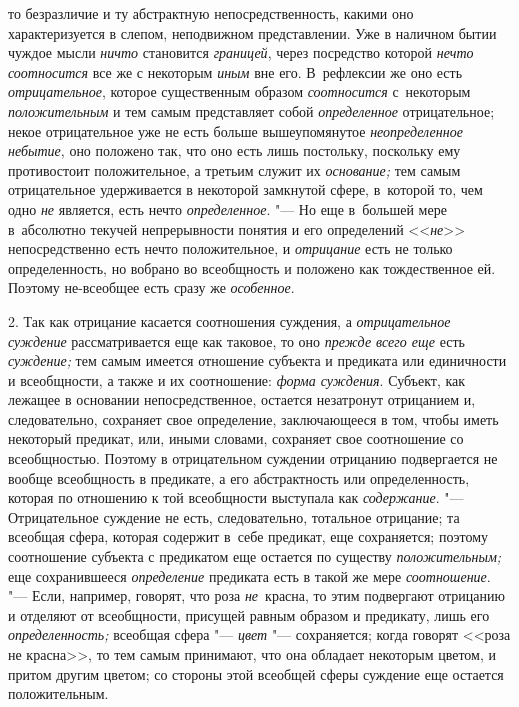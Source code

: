 то безразличие и ту абстрактную непосредственность, какими оно характеризуется
в слепом, неподвижном представлении. Уже в наличном бытии чуждое мысли
{\em ничто} становится {\em границей}, через посредство которой
{\em нечто соотносится} все же с некоторым {\em иным} вне его. В~рефлексии же
оно есть {\em отрицательное}, которое существенным образом {\em соотносится}
с~некоторым {\em положительным} и тем самым представляет собой
{\em определенное} отрицательное; некое отрицательное уже не есть больше
вышеупомянутое {\em неопределенное небытие}, оно положено так, что оно есть
лишь постольку, поскольку ему противостоит положительное, а третьим служит их
{\em основание;} тем самым отрицательное удерживается в некоторой замкнутой
сфере, в~которой то, чем одно {\em не} является, есть нечто {\em определенное}.
"--- Но еще в~большей мере в~абсолютно текучей непрерывности понятия и его
определений <<{\em не}>> непосредственно есть нечто
положительное, и {\em отрицание} есть не только определенность,
но вобрано во всеобщность и положено как тождественное ей. Поэтому
не-всеобщее есть сразу же {\em особенное}.

2. Так как отрицание касается соотношения суждения, а
{\em отрицательное суждение} рассматривается еще как таковое, то оно
{\em прежде всего еще} есть {\em суждение;}
тем самым имеется отношение субъекта и предиката или
единичности и всеобщности, а также и их соотношение: {\em форма суждения}.
Субъект, как лежащее в основании непосредственное, остается
незатронут отрицанием и, следовательно, сохраняет свое определение,
заключающееся в том, чтобы иметь некоторый предикат, или, иными словами,
сохраняет свое соотношение со всеобщностью. Поэтому в отрицательном
суждении отрицанию подвергается не вообще всеобщность в предикате, а его
абстрактность или определенность, которая по отношению к той всеобщности
выступала как {\em содержание}. "---
Отрицательное суждение не есть, следовательно, тотальное
отрицание; та всеобщая сфера, которая содержит в~себе предикат, еще
сохраняется; поэтому соотношение субъекта с предикатом еще остается по
существу {\em положительным;} еще сохранившееся {\em определение}
предиката есть в такой же мере {\em соотношение}. "--- Если, например,
говорят, что роза {\em не}~красна, то этим подвергают отрицанию и отделяют
от всеобщности, присущей равным образом и предикату, лишь его
{\em определенность;} всеобщая сфера "--- {\em цвет}
"--- сохраняется; когда говорят <<роза не красна>>, то тем самым
принимают, что она обладает некоторым цветом, и притом другим цветом; со
стороны этой всеобщей сферы суждение еще остается положительным.


